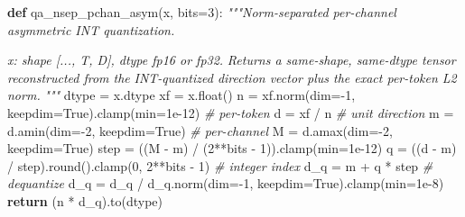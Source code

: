 \documentclass[
]{article}
\newenvironment{Shaded}{}{}
\newcommand{\BuiltInTok}[1]{\textcolor[rgb]{0.00,0.50,0.00}{#1}}
\newcommand{\CommentTok}[1]{\textcolor[rgb]{0.38,0.63,0.69}{\textit{#1}}}
\newcommand{\ControlFlowTok}[1]{\textcolor[rgb]{0.00,0.44,0.13}{\textbf{#1}}}
\newcommand{\DecValTok}[1]{\textcolor[rgb]{0.25,0.63,0.44}{#1}}
\newcommand{\FloatTok}[1]{\textcolor[rgb]{0.25,0.63,0.44}{#1}}
\newcommand{\KeywordTok}[1]{\textcolor[rgb]{0.00,0.44,0.13}{\textbf{#1}}}
\newcommand{\NormalTok}[1]{#1}
\newcommand{\OperatorTok}[1]{\textcolor[rgb]{0.40,0.40,0.40}{#1}}
\newcommand{\VariableTok}[1]{\textcolor[rgb]{0.10,0.09,0.49}{#1}}
\begin{document}
\begin{Shaded}
\begin{Highlighting}[]
\KeywordTok{def}\NormalTok{ qa\_nsep\_pchan\_asym(x, bits}\OperatorTok{=}\DecValTok{3}\NormalTok{):}
    \CommentTok{"""Norm{-}separated per{-}channel asymmetric INT quantization.}

\CommentTok{    x: shape [..., T, D], dtype fp16 or fp32.}
\CommentTok{    Returns a same{-}shape, same{-}dtype tensor reconstructed from the}
\CommentTok{    INT{-}quantized direction vector plus the exact per{-}token L2 norm.}
\CommentTok{    """}
\NormalTok{    dtype }\OperatorTok{=}\NormalTok{ x.dtype}
\NormalTok{    xf }\OperatorTok{=}\NormalTok{ x.}\BuiltInTok{float}\NormalTok{()}
\NormalTok{    n }\OperatorTok{=}\NormalTok{ xf.norm(dim}\OperatorTok{={-}}\DecValTok{1}\NormalTok{, keepdim}\OperatorTok{=}\VariableTok{True}\NormalTok{).clamp(}\BuiltInTok{min}\OperatorTok{=}\FloatTok{1e{-}12}\NormalTok{)  }\CommentTok{\# per{-}token}
\NormalTok{    d }\OperatorTok{=}\NormalTok{ xf }\OperatorTok{/}\NormalTok{ n                                          }\CommentTok{\# unit direction}
\NormalTok{    m }\OperatorTok{=}\NormalTok{ d.amin(dim}\OperatorTok{={-}}\DecValTok{2}\NormalTok{, keepdim}\OperatorTok{=}\VariableTok{True}\NormalTok{)                    }\CommentTok{\# per{-}channel}
\NormalTok{    M }\OperatorTok{=}\NormalTok{ d.amax(dim}\OperatorTok{={-}}\DecValTok{2}\NormalTok{, keepdim}\OperatorTok{=}\VariableTok{True}\NormalTok{)}
\NormalTok{    step }\OperatorTok{=}\NormalTok{ ((M }\OperatorTok{{-}}\NormalTok{ m) }\OperatorTok{/}\NormalTok{ (}\DecValTok{2}\OperatorTok{**}\NormalTok{bits }\OperatorTok{{-}} \DecValTok{1}\NormalTok{)).clamp(}\BuiltInTok{min}\OperatorTok{=}\FloatTok{1e{-}12}\NormalTok{)}
\NormalTok{    q }\OperatorTok{=}\NormalTok{ ((d }\OperatorTok{{-}}\NormalTok{ m) }\OperatorTok{/}\NormalTok{ step).}\BuiltInTok{round}\NormalTok{().clamp(}\DecValTok{0}\NormalTok{, }\DecValTok{2}\OperatorTok{**}\NormalTok{bits }\OperatorTok{{-}} \DecValTok{1}\NormalTok{)  }\CommentTok{\# integer index}
\NormalTok{    d\_q }\OperatorTok{=}\NormalTok{ m }\OperatorTok{+}\NormalTok{ q }\OperatorTok{*}\NormalTok{ step                                  }\CommentTok{\# dequantize}
\NormalTok{    d\_q }\OperatorTok{=}\NormalTok{ d\_q }\OperatorTok{/}\NormalTok{ d\_q.norm(dim}\OperatorTok{={-}}\DecValTok{1}\NormalTok{, keepdim}\OperatorTok{=}\VariableTok{True}\NormalTok{).clamp(}\BuiltInTok{min}\OperatorTok{=}\FloatTok{1e{-}8}\NormalTok{)}
    \ControlFlowTok{return}\NormalTok{ (n }\OperatorTok{*}\NormalTok{ d\_q).to(dtype)}
\end{Highlighting}
\end{Shaded}
\end{document}
